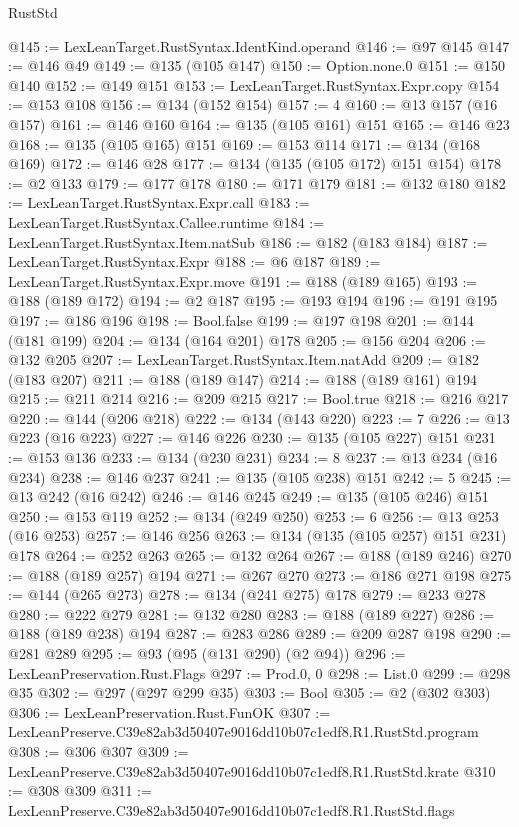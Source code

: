 \begin{lexlean}{RustStd}
\begin{coremodule}
@145 := LexLeanTarget.RustSyntax.IdentKind.operand
@146 := @97 @145
@147 := @146 @49
@149 := @135 (@105 @147)
@150 := Option.none.{0}
@151 := @150 @140
@152 := @149 @151
@153 := LexLeanTarget.RustSyntax.Expr.copy
@154 := @153 @108
@156 := @134 (@152 @154)
@157 := 4
@160 := @13 @157 (@16 @157)
@161 := @146 @160
@164 := @135 (@105 @161) @151
@165 := @146 @23
@168 := @135 (@105 @165) @151
@169 := @153 @114
@171 := @134 (@168 @169)
@172 := @146 @28
@177 := @134 (@135 (@105 @172) @151 @154)
@178 := @2 @133
@179 := @177 @178
@180 := @171 @179
@181 := @132 @180
@182 := LexLeanTarget.RustSyntax.Expr.call
@183 := LexLeanTarget.RustSyntax.Callee.runtime
@184 := LexLeanTarget.RustSyntax.Item.natSub
@186 := @182 (@183 @184)
@187 := LexLeanTarget.RustSyntax.Expr
@188 := @6 @187
@189 := LexLeanTarget.RustSyntax.Expr.move
@191 := @188 (@189 @165)
@193 := @188 (@189 @172)
@194 := @2 @187
@195 := @193 @194
@196 := @191 @195
@197 := @186 @196
@198 := Bool.false
@199 := @197 @198
@201 := @144 (@181 @199)
@204 := @134 (@164 @201) @178
@205 := @156 @204
@206 := @132 @205
@207 := LexLeanTarget.RustSyntax.Item.natAdd
@209 := @182 (@183 @207)
@211 := @188 (@189 @147)
@214 := @188 (@189 @161) @194
@215 := @211 @214
@216 := @209 @215
@217 := Bool.true
@218 := @216 @217
@220 := @144 (@206 @218)
@222 := @134 (@143 @220)
@223 := 7
@226 := @13 @223 (@16 @223)
@227 := @146 @226
@230 := @135 (@105 @227) @151
@231 := @153 @136
@233 := @134 (@230 @231)
@234 := 8
@237 := @13 @234 (@16 @234)
@238 := @146 @237
@241 := @135 (@105 @238) @151
@242 := 5
@245 := @13 @242 (@16 @242)
@246 := @146 @245
@249 := @135 (@105 @246) @151
@250 := @153 @119
@252 := @134 (@249 @250)
@253 := 6
@256 := @13 @253 (@16 @253)
@257 := @146 @256
@263 := @134 (@135 (@105 @257) @151 @231) @178
@264 := @252 @263
@265 := @132 @264
@267 := @188 (@189 @246)
@270 := @188 (@189 @257) @194
@271 := @267 @270
@273 := @186 @271 @198
@275 := @144 (@265 @273)
@278 := @134 (@241 @275) @178
@279 := @233 @278
@280 := @222 @279
@281 := @132 @280
@283 := @188 (@189 @227)
@286 := @188 (@189 @238) @194
@287 := @283 @286
@289 := @209 @287 @198
@290 := @281 @289
@295 := @93 (@95 (@131 @290) (@2 @94))
@296 := LexLeanPreservation.Rust.Flags
@297 := Prod.{0, 0}
@298 := List.{0}
@299 := @298 @35
@302 := @297 (@297 @299 @35)
@303 := Bool
@305 := @2 (@302 @303)
@306 := LexLeanPreservation.Rust.FunOK
@307 := LexLeanPreserve.C39e82ab3d50407e9016dd10b07c1edf8.R1.RustStd.program
@308 := @306 @307
@309 := LexLeanPreserve.C39e82ab3d50407e9016dd10b07c1edf8.R1.RustStd.krate
@310 := @308 @309
@311 := LexLeanPreserve.C39e82ab3d50407e9016dd10b07c1edf8.R1.RustStd.flags

\end{coremodule}
\end{lexlean}
